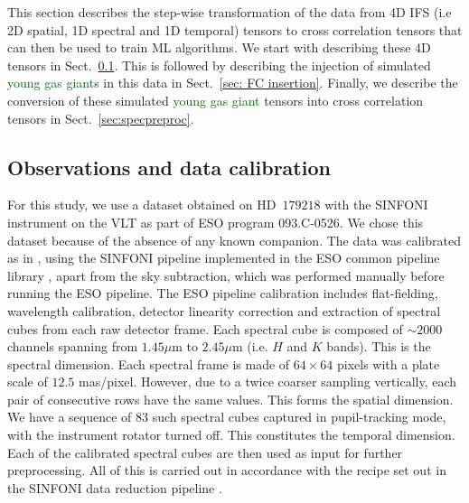 \documentclass{aa}
\newcommand{\newchange}[1]{\textcolor{darkgreen}{#1}}
\begin{document}
This section describes the step-wise transformation of the data from 4D IFS (i.e 2D spatial, 1D spectral and 1D temporal) tensors to cross correlation tensors that can then be used to train ML algorithms.
We start with describing these 4D tensors in Sect.~\ref{sec:datadesc}.
This is followed by describing the injection of simulated \newchange{young gas giant}s in this data in Sect.~\ref{sec: FC insertion}.
Finally, we describe the conversion of these simulated \newchange{young gas giant} tensors into cross correlation tensors in Sect.~\ref{sec:specpreproc}.

\subsection{Observations and data calibration}\label{sec:datadesc}

For this study, we use a dataset obtained on HD~$179218$ with the SINFONI instrument on the VLT \citep{2004SINFONI,2003SEisenhauer} as part of ESO program 093.C-0526.
We chose this dataset because of the absence of any known companion.
The data was calibrated as in \citet{2018A&ChristiaensHD142527}, using the SINFONI pipeline implemented in the ESO common pipeline library \citep[EsoRex version 3.10.2;][]{2006Abuter}, apart from the sky subtraction, which was performed manually before running the ESO pipeline.
The ESO pipeline calibration includes flat-fielding, wavelength calibration, detector linearity correction and extraction of spectral cubes from each raw detector frame. 
Each spectral cube is composed of $\sim 2000$ channels spanning from $1.45\mu$m to $2.45 \mu$m (i.e. $H$ and $K$ bands).
This is the spectral dimension.
Each spectral frame is made of $64\times64$ pixels with a plate scale of $12.5$ mas/pixel. However, due to a twice coarser sampling vertically, each pair of consecutive rows have the same values.
This forms the spatial dimension.
We have a sequence of $83$ such spectral cubes captured in pupil-tracking mode, with the instrument rotator turned off.
This constitutes the temporal dimension.
Each of the calibrated spectral cubes are then used as input for further preprocessing.
All of this is carried out in accordance with the recipe set out in the SINFONI data reduction pipeline \citep{2006Abuter}.
\end{document}
